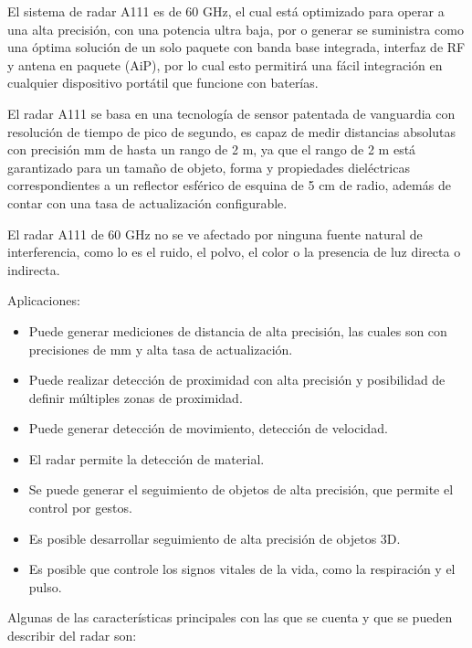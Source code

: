 El sistema de radar A111 es de 60 GHz, el cual está optimizado para operar a una alta precisión, con una potencia ultra baja, por o generar se suministra como una óptima solución de un solo paquete con banda base integrada, interfaz de RF y antena en paquete (AiP), por lo cual esto permitirá una fácil integración en cualquier dispositivo portátil que funcione con baterías.

El radar A111 se basa en una tecnología de sensor patentada de vanguardia con resolución de tiempo de pico de segundo, es capaz de medir distancias absolutas con precisión mm de hasta un rango de 2 m, ya que el rango de 2 m está garantizado para un tamaño de objeto, forma y propiedades dieléctricas correspondientes a un reflector esférico de esquina de 5 cm de radio, además de contar con una tasa de actualización configurable.

El radar A111 de 60 GHz no se ve afectado por ninguna fuente natural de interferencia, como lo es el ruido, el polvo, el color o la presencia de luz directa o indirecta.


Aplicaciones:
\begin{itemize}
	\item Puede generar mediciones de distancia de alta precisión, las cuales son con precisiones de mm y alta tasa de actualización.
	\item Puede realizar detección de proximidad con alta precisión y posibilidad de definir múltiples zonas de proximidad.
	\item Puede generar detección de movimiento, detección de velocidad.
	\item El radar permite la detección de material.
	\item Se puede generar el seguimiento de objetos de alta precisión, que permite el control por gestos.
	\item Es posible desarrollar seguimiento de alta precisión de objetos 3D.
	\item Es posible que controle los signos vitales de la vida, como la respiración y el pulso.
\end{itemize}

Algunas de las características principales con las que se cuenta y que se pueden describir del radar son:

